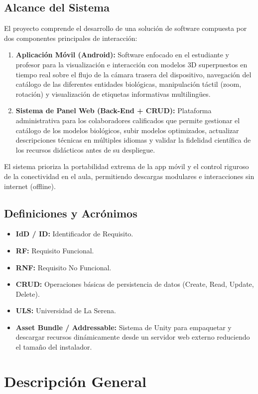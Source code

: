\documentclass[11pt,a4paper]{article}
\begin{document}
\subsection{Alcance del Sistema}
El proyecto comprende el desarrollo de una solución de software compuesta por dos componentes principales de interacción:
\begin{enumerate}
    \item \textbf{Aplicación Móvil (Android):} Software enfocado en el estudiante y profesor para la visualización e interacción con modelos 3D superpuestos en tiempo real sobre el flujo de la cámara trasera del dispositivo, navegación del catálogo de las diferentes entidades biológicas, manipulación táctil (zoom, rotación) y visualización de etiquetas informativas multilingües.
    \item \textbf{Sistema de Panel Web (Back-End + CRUD):} Plataforma administrativa para los colaboradores calificados que permite gestionar el catálogo de los modelos biológicos, subir modelos optimizados, actualizar descripciones técnicas en múltiples idiomas y validar la fidelidad científica de los recursos didácticos antes de su despliegue.
\end{enumerate}

El sistema prioriza la portabilidad extrema de la app móvil y el control riguroso de la conectividad en el aula, permitiendo descargas modulares e interacciones sin internet (offline).

\subsection{Definiciones y Acrónimos}
\begin{itemize}
    \item \textbf{IdD / ID:} Identificador de Requisito.
    \item \textbf{RF:} Requisito Funcional.
    \item \textbf{RNF:} Requisito No Funcional.
    \item \textbf{CRUD:} Operaciones básicas de persistencia de datos (Create, Read, Update, Delete).
    \item \textbf{ULS:} Universidad de La Serena.
    \item \textbf{Asset Bundle / Addressable:} Sistema de Unity para empaquetar y descargar recursos dinámicamente desde un servidor web externo reduciendo el tamaño del instalador.
\end{itemize}
\newpage
\section{Descripción General}
\end{document}
